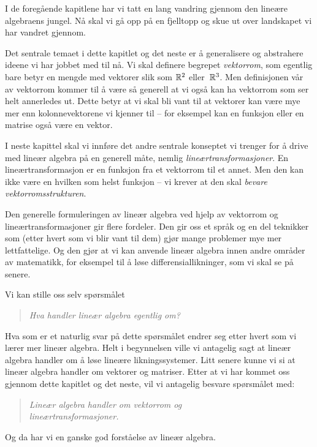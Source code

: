 

\label{ch:vektorrom}

I de foregående kapitlene har vi tatt en lang vandring gjennom den
lineære algebraens jungel.  Nå skal vi gå opp på en fjelltopp og skue
ut over landskapet vi har vandret gjennom.

Det sentrale temaet i dette kapitlet og det neste er å generalisere og
abstrahere ideene vi har jobbet med til nå.  Vi skal definere begrepet
\emph{vektorrom}, som egentlig bare betyr en mengde med vektorer slik
som $\mathbb{R}^2$ eller~$\mathbb{R}^3$.  Men definisjonen vår av vektorrom kommer til
å være så generell at vi også kan ha vektorrom som ser helt annerledes
ut.  Dette betyr at vi skal bli vant til at vektorer kan være mye mer
enn kolonnevektorene vi kjenner til -- for eksempel kan en funksjon
eller en matrise også være en vektor.

I neste kapittel skal vi innføre det andre sentrale konseptet vi
trenger for å drive med lineær algebra på en generell måte, nemlig
\emph{lineærtransformasjoner}.  En lineærtransformasjon er en funksjon
fra et vektorrom til et annet.  Men den kan ikke være en hvilken som
helst funksjon -- vi krever at den skal \emph{bevare
  vektorromsstrukturen}.

Den generelle formuleringen av lineær algebra ved hjelp av vektorrom
og lineærtransformasjoner gir flere fordeler.  Den gir oss et språk og
en del teknikker som (etter hvert som vi blir vant til dem) gjør mange
problemer mye mer lettfattelige.  Og den gjør at vi kan anvende lineær
algebra innen andre områder av matematikk, for eksempel til å løse
differensiallikninger, som vi skal se på senere.


\medskip
Vi kan stille oss selv spørsmålet
\begin{quote}
\emph{Hva handler lineær algebra egentlig om?}
\end{quote}
Hva som er et naturlig svar på dette spørsmålet endrer seg etter
hvert som vi lærer mer lineær algebra.  Helt i begynnelsen ville vi
antagelig sagt at lineær algebra handler om å løse lineære
likningssystemer.  Litt senere kunne vi si at lineær algebra handler
om vektorer og matriser.  Etter at vi har kommet oss gjennom dette
kapitlet og det neste, vil vi antagelig besvare spørsmålet med:
\begin{quote}
\emph{Lineær algebra handler om vektorrom og\\lineærtransformasjoner.}
\end{quote}
Og da har vi en ganske god forståelse av lineær algebra.


